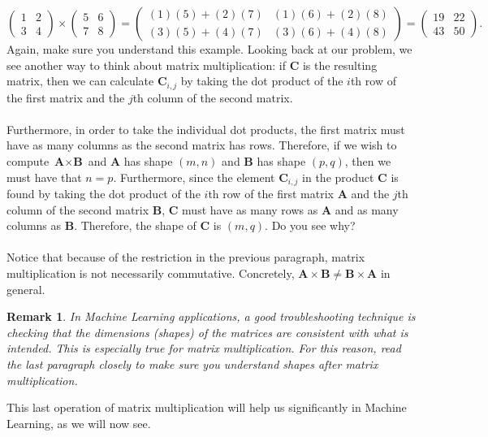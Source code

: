 \documentclass{article}
\newtheorem*{remark}{Remark}
\begin{document}
\[\begin{pmatrix}
1 & 2\\
3 & 4
\end{pmatrix}\times \begin{pmatrix}
5 & 6\\
7 & 8
\end{pmatrix}=\begin{pmatrix}
(1)(5)+(2)(7) & (1)(6)+(2)(8)\\
(3)(5)+(4)(7) & (3)(6)+(4)(8)
\end{pmatrix}=\begin{pmatrix}
19 & 22\\
43 & 50
\end{pmatrix}.\]
Again, make sure you understand this example. Looking back at our problem, we see another way to think about matrix multiplication: if \textbf{C} is the resulting matrix, then we can calculate $\textbf{C}_{i,j}$ by taking the dot product of the $i$th row of the first matrix and the $j$th column of the second matrix. 
\\
\\
Furthermore, in order to take the individual dot products, the first matrix must have as many columns as the second matrix has rows. Therefore, if we wish to compute $\textbf{A}\times \textbf{B}$ and \textbf{A} has shape $(m,n)$ and \textbf{B} has shape $(p,q)$, then we must have that $n=p$. Furthermore, since the element $\textbf{C}_{i,j}$ in the product \textbf{C} is found by taking the dot product of the $i$th row of the first matrix \textbf{A} and the $j$th column of the second matrix \textbf{B}, \textbf{C} must have as many rows as \textbf{A} and as many columns as \textbf{B}. Therefore, the shape of \textbf{C} is $(m,q)$. Do you see why?
\\
\\
Notice that because of the restriction in the previous paragraph, matrix multiplication is not necessarily commutative. Concretely, $\textbf{A}\times \textbf{B}\neq \textbf{B}\times \textbf{A}$ in general. 
\begin{remark}
In Machine Learning applications, a good troubleshooting technique is checking that the dimensions (shapes) of the matrices are consistent with what is intended. This is especially true for matrix multiplication. For this reason, read the last paragraph closely to make sure you understand shapes after matrix multiplication.
\end{remark}
This last operation of matrix multiplication will help us significantly in Machine Learning, as we will now see. 
\end{document}

